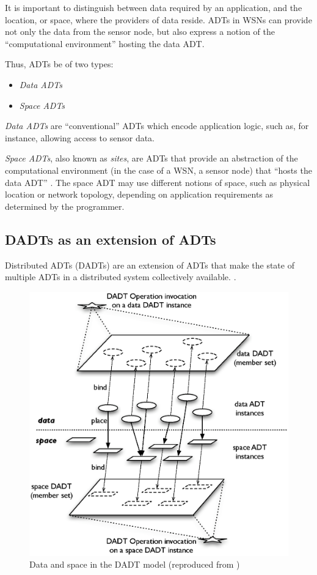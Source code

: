 It is important to distinguish between data required by an application, and
the location, or space, where the providers of data reside. ADTs in WSNs can
provide not only the data from the sensor node, but also express a notion
of the ``computational environment'' hosting the data ADT.

Thus, ADTs be of two types:

\begin{itemize}
  \item \emph{Data ADTs}
  \item \emph{Space ADTs} 
\end{itemize}

\emph{Data ADTs} are ``conventional'' ADTs which encode application logic, such
as, for instance, allowing access to sensor data.

\emph{Space ADTs}, also known as \emph{sites}, are ADTs that provide an
abstraction of the computational environment (in the case of a WSN, a sensor
node) that ``hosts the data ADT'' \cite{migliavacca_DADT:2006}. The space ADT may
use different notions of space, such as physical location or network topology,
depending on application requirements as determined by the programmer.

\subsection{DADTs as an extension of ADTs} \label{subsec:DADTsConcepts}
Distributed ADTs (DADTs) are an extension of ADTs that make the state of multiple ADTs in a
distributed system collectively available.
\cite{migliavacca_DADT:2006}. 

\begin{figure}[h]
\centering
\includegraphics[scale=0.65]{img/DADTs.eps} 
\caption[Data and space in the DADT model]{Data and space in the DADT model (reproduced from 
\cite{migliavacca_DADT:2006})}
\label{Fig:DADTs}
\end{figure}

